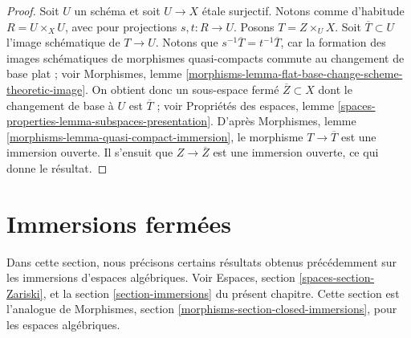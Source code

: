 \begin{proof}
Soit $U$ un schéma et soit $U \to X$ \'etale surjectif.
Notons comme d'habitude $R = U \times_X U$, avec pour projections
$s, t : R \to U$. Posons $T = Z \times_U X$. Soit $\overline{T} \subset U$
l'image schématique de $T \to U$. Notons que
$s^{-1}\overline{T} = t^{-1}\overline{T}$, car la formation des
images schématiques de morphismes quasi-compacts commute
au changement de base plat ; voir
Morphismes, lemme \ref{morphisms-lemma-flat-base-change-scheme-theoretic-image}.
On obtient donc un sous-espace fermé $\overline{Z} \subset X$ dont
le changement de base à $U$ est $\overline{T}$ ; voir
Propriétés des espaces, lemme
\ref{spaces-properties-lemma-subspaces-presentation}.
D'après Morphismes, lemme \ref{morphisms-lemma-quasi-compact-immersion},
le morphisme $T \to \overline{T}$
est une immersion ouverte. Il s'ensuit que $Z \to \overline{Z}$ est
une immersion ouverte, ce qui donne le résultat.
\end{proof}


















\section{Immersions fermées}
\label{section-closed-immersions}

\noindent
Dans cette section, nous précisons certains résultats obtenus précédemment sur les
immersions d'espaces algébriques. Voir
Espaces, section \ref{spaces-section-Zariski},
et la
section \ref{section-immersions} du présent chapitre.
Cette section est l'analogue de
Morphismes, section \ref{morphisms-section-closed-immersions},
pour les espaces algébriques.

